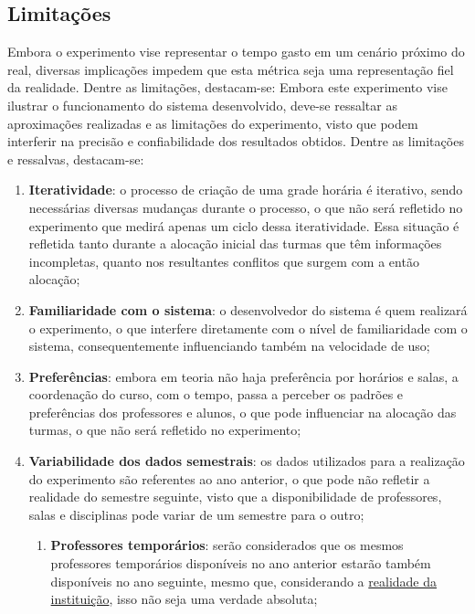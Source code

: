 \subsection{Limitações}

Embora o experimento vise representar o tempo gasto em um cenário próximo do real, diversas implicações impedem que esta métrica seja uma representação fiel da realidade. Dentre as limitações, destacam-se:
Embora este experimento vise ilustrar o funcionamento do sistema desenvolvido, deve-se ressaltar as aproximações realizadas e as limitações do experimento, visto que podem interferir na precisão e confiabilidade dos resultados obtidos. Dentre as limitações e ressalvas, destacam-se:

\begin{enumerate}
  \item \textbf{Iteratividade}: o processo de criação de uma grade horária é iterativo, sendo necessárias diversas mudanças durante o processo, o que não será refletido no experimento que medirá apenas um ciclo dessa iteratividade. Essa situação é refletida tanto durante a alocação inicial das turmas que têm informações incompletas, quanto nos resultantes conflitos que surgem com a então alocação;
  \item \textbf{Familiaridade com o sistema}: o desenvolvedor do sistema é quem realizará o experimento, o que interfere diretamente com o nível de familiaridade com o sistema, consequentemente influenciando também na velocidade de uso;
  \item \textbf{Preferências}: embora em teoria não haja preferência por horários e salas, a coordenação do curso, com o tempo, passa a perceber os padrões e preferências dos professores e alunos, o que pode influenciar na alocação das turmas, o que não será refletido no experimento;
  \item \textbf{Variabilidade dos dados semestrais}: os dados utilizados para a realização do experimento são referentes ao ano anterior, o que pode não refletir a realidade do semestre seguinte, visto que a disponibilidade de professores, salas e disciplinas pode variar de um semestre para o outro;
        \begin{enumerate}
          \item \textbf{Professores temporários}: serão considerados que os mesmos professores temporários disponíveis no ano anterior estarão também disponíveis no ano seguinte, mesmo que, considerando a
                \hyperref[chap:instituicao]{realidade da instituição},
                isso não seja uma verdade absoluta;

\end{enumerate}
\end{enumerate}

